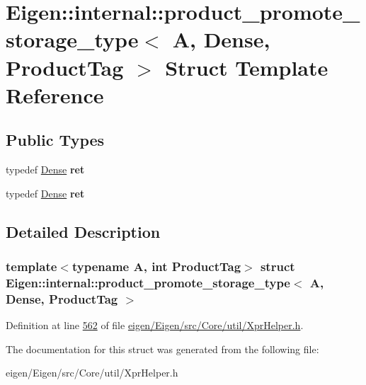 \hypertarget{struct_eigen_1_1internal_1_1product__promote__storage__type_3_01_a_00_01_dense_00_01_product_tag_01_4}{}\section{Eigen\+:\+:internal\+:\+:product\+\_\+promote\+\_\+storage\+\_\+type$<$ A, Dense, Product\+Tag $>$ Struct Template Reference}
\label{struct_eigen_1_1internal_1_1product__promote__storage__type_3_01_a_00_01_dense_00_01_product_tag_01_4}
\subsection*{Public Types}
\begin{DoxyCompactItemize}
\item 
\mbox{\label{struct_eigen_1_1internal_1_1product__promote__storage__type_3_01_a_00_01_dense_00_01_product_tag_01_4_ad5f8e6a11d822628b5eaf0d9ca724834}} 
typedef \hyperlink{struct_eigen_1_1_dense}{Dense} {\bfseries ret}
\item 
\mbox{\label{struct_eigen_1_1internal_1_1product__promote__storage__type_3_01_a_00_01_dense_00_01_product_tag_01_4_ad5f8e6a11d822628b5eaf0d9ca724834}} 
typedef \hyperlink{struct_eigen_1_1_dense}{Dense} {\bfseries ret}
\end{DoxyCompactItemize}


\subsection{Detailed Description}
\subsubsection*{template$<$typename A, int Product\+Tag$>$\newline
struct Eigen\+::internal\+::product\+\_\+promote\+\_\+storage\+\_\+type$<$ A, Dense, Product\+Tag $>$}



Definition at line \hyperlink{eigen_2_eigen_2src_2_core_2util_2_xpr_helper_8h_source_l00562}{562} of file \hyperlink{eigen_2_eigen_2src_2_core_2util_2_xpr_helper_8h_source}{eigen/\+Eigen/src/\+Core/util/\+Xpr\+Helper.\+h}.



The documentation for this struct was generated from the following file\+:\begin{DoxyCompactItemize}
\item 
eigen/\+Eigen/src/\+Core/util/\+Xpr\+Helper.\+h\end{DoxyCompactItemize}
